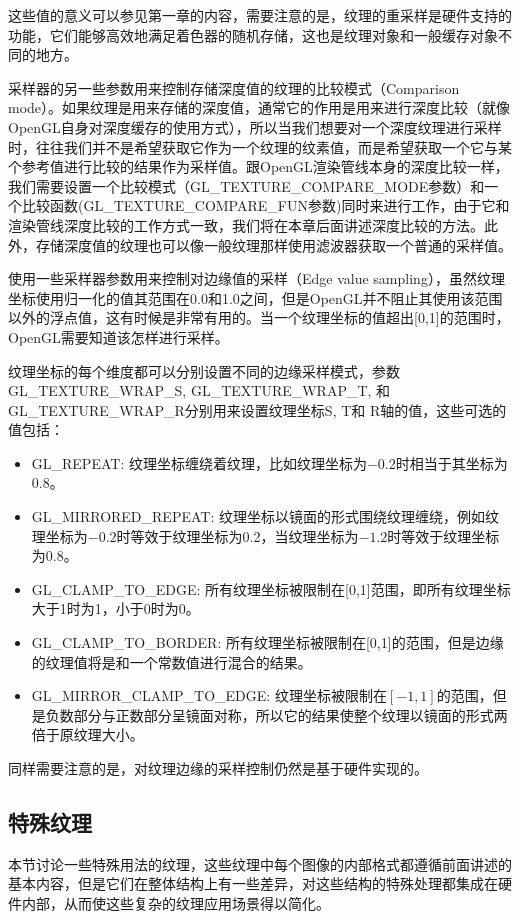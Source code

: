 这些值的意义可以参见第一章的内容，需要注意的是，纹理的重采样是硬件支持的功能，它们能够高效地满足着色器的随机存储，这也是纹理对象和一般缓存对象不同的地方。

采样器的另一些参数用来控制存储深度值的纹理的比较模式（Comparison mode）。如果纹理是用来存储的深度值，通常它的作用是用来进行深度比较（就像OpenGL自身对深度缓存的使用方式），所以当我们想要对一个深度纹理进行采样时，往往我们并不是希望获取它作为一个纹理的纹素值，而是希望获取一个它与某个参考值进行比较的结果作为采样值。跟OpenGL渲染管线本身的深度比较一样，我们需要设置一个比较模式（GL\_TEXTURE\_COMPARE\_MODE参数）和一个比较函数(GL\_TEXTURE\_COMPARE\_FUN参数)同时来进行工作，由于它和渲染管线深度比较的工作方式一致，我们将在本章后面讲述深度比较的方法。此外，存储深度值的纹理也可以像一般纹理那样使用滤波器获取一个普通的采样值。

使用一些采样器参数用来控制对边缘值的采样（Edge value sampling），虽然纹理坐标使用归一化的值其范围在0.0和1.0之间，但是OpenGL并不阻止其使用该范围以外的浮点值，这有时候是非常有用的。当一个纹理坐标的值超出[0,1]的范围时，OpenGL需要知道该怎样进行采样。

纹理坐标的每个维度都可以分别设置不同的边缘采样模式，参数GL\_TEXTURE\_WRAP\_S, GL\_TEXTURE\_WRAP\_T, 和 GL\_TEXTURE\_WRAP\_R分别用来设置纹理坐标S, T和 R轴的值，这些可选的值包括：

\begin{itemize}
	\item GL\_REPEAT: 纹理坐标缠绕着纹理，比如纹理坐标为$-0.2$时相当于其坐标为0.8。	
	\item GL\_MIRRORED\_REPEAT: 纹理坐标以镜面的形式围绕纹理缠绕，例如纹理坐标为$-0.2$时等效于纹理坐标为0.2，当纹理坐标为$-1.2$时等效于纹理坐标为0.8。
	\item GL\_CLAMP\_TO\_EDGE: 所有纹理坐标被限制在[0,1]范围，即所有纹理坐标大于1时为1，小于0时为0。
	\item GL\_CLAMP\_TO\_BORDER: 所有纹理坐标被限制在[0,1]的范围，但是边缘的纹理值将是和一个常数值进行混合的结果。
	\item GL\_MIRROR\_CLAMP\_TO\_EDGE: 纹理坐标被限制在$[-1,1]$的范围，但是负数部分与正数部分呈镜面对称，所以它的结果使整个纹理以镜面的形式两倍于原纹理大小。
\end{itemize}

同样需要注意的是，对纹理边缘的采样控制仍然是基于硬件实现的。





\subsection{特殊纹理}
本节讨论一些特殊用法的纹理，这些纹理中每个图像的内部格式都遵循前面讲述的基本内容，但是它们在整体结构上有一些差异，对这些结构的特殊处理都集成在硬件内部，从而使这些复杂的纹理应用场景得以简化。

